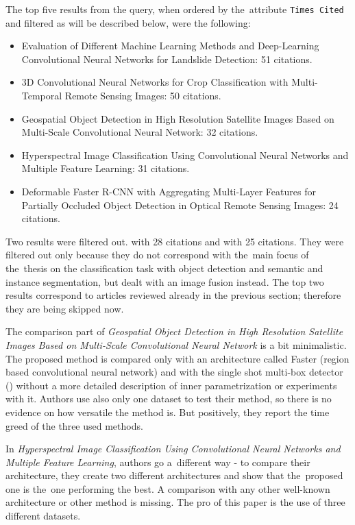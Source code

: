 \noindent The top five results from the query, when ordered by the~attribute \verb|Times Cited| and filtered as will be described below, were the following:

\begin{itemize}
	\item Evaluation of Different Machine Learning Methods and Deep-Learning Convolutional Neural Networks for Landslide Detection: 51 citations. \cite{landslide-evaluation}
	\item 3D Convolutional Neural Networks for Crop Classification with Multi-Temporal Remote Sensing Images: 50 citations. \cite{3d-cnn-crop}
	\item Geospatial Object Detection in High Resolution Satellite Images Based on Multi-Scale Convolutional Neural Network: 32 citations. \cite{object-detection-hrs-multi-scale}
	\item Hyperspectral Image Classification Using Convolutional Neural Networks and Multiple Feature Learning: 31 citations. \cite{hyperspectral-multiple-feat-cnn}
	\item Deformable Faster R-CNN with Aggregating Multi-Layer Features for Partially Occluded Object Detection in Optical Remote Sensing Images: 24 citations. \cite{deformable-faster-r-cnn}
\end{itemize}

Two results were filtered out. \cite{cnn-fusion-clouds} with 28 citations and \cite{cnn-fusion-hr-hsr} with 25 citations. They were filtered out only because they do not correspond with the~main focus of the~thesis on the classification task with object detection and semantic and instance segmentation, but dealt with an image fusion instead. The top two results correspond to articles reviewed already in the previous section; therefore they are being skipped now.

The comparison part of \textit{Geospatial Object Detection in High Resolution Satellite Images Based on Multi-Scale Convolutional Neural Network} is a bit minimalistic. The proposed method is compared only with an architecture called Faster  (region based convolutional neural network) \cite{faster-rcnn} and with the single shot multi-box detector () \cite{ssd} without a more detailed description of inner parametrization or experiments with it. Authors use also only one dataset to test their method, so there is no evidence on how versatile the method is. But positively, they report the time greed of the three used methods.

In \textit{Hyperspectral Image Classification Using Convolutional Neural Networks and Multiple Feature Learning}, authors go a~different way - to compare their architecture, they create two different architectures and show that the~proposed one is the~one performing the best. A comparison with any other well-known architecture or other  method is missing. The pro of this paper is the use of three different datasets.

